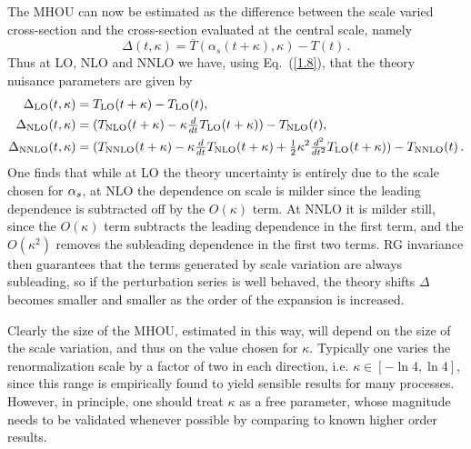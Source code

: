 The MHOU can now be estimated as the difference between the scale
varied cross-section and the cross-section evaluated at the central
scale, namely
\begin{equation}\label{1.9}
\Delta(t,\kappa) = \overline{T}(\alpha_s(t + \kappa), \kappa) - T(t) \, .
\end{equation}
Thus at LO, NLO and NNLO we have, using Eq.~(\ref{1.8}), that the theory nuisance
parameters are given by
\begin{align}
  \label{1.10}
\begin{split}
\Delta_{\text{LO}}(t,\kappa) & = T_{\text{LO}}(t + \kappa)-T_{\text{LO}}(t), \\
{\Delta}_{\text{NLO}}(t,\kappa) & = (T_{\text{NLO}}(t + \kappa) - \kappa\hbox{${{d}\over {dt}}$}{T}_{\text{LO}}(t + \kappa))-T_{\text{NLO}}(t), \\
{\Delta}_{\text{NNLO}}(t, \kappa) & = (T_{\text{NNLO}}(t + \kappa) - \kappa\hbox{${{d}\over {dt}}$}{T}_{\text{NLO}}(t + \kappa) + \hbox{${{1}\over {2}}$}\kappa^2  \hbox{${{d^2}\over {dt^2}}$}{T}_{\text{LO}}(t + \kappa))-T_{\text{NNLO}}(t) \, .
\end{split}
\end{align}
One finds that while at LO the theory uncertainty is entirely due to the scale chosen
for $\alpha_s$, at NLO the dependence on scale is milder since the leading
dependence is subtracted off by the $O(\kappa)$ term.  At NNLO it
is milder still, since the $O(\kappa)$ term subtracts the leading
dependence in the first term, and the $O(\kappa^2)$ removes the
subleading dependence in the first two terms.
%
RG
invariance then guarantees that the terms generated by scale variation
are always subleading, so if the perturbation series is well
behaved, the theory shifts $\Delta$ becomes smaller and smaller as the order of the
expansion is increased. 

Clearly the size of the MHOU, estimated in this way, will depend on
the size of the scale variation, and thus on the value chosen for
$\kappa$. Typically one varies the renormalization scale by a factor of two in each
direction, i.e. $\kappa\in[-\ln 4,\ln4]$, since this range is
empirically found to yield sensible results for many processes.
%
However, in principle, one should treat $\kappa$ as a free parameter,
whose magnitude needs to be validated whenever possible by comparing
to known higher order results.

